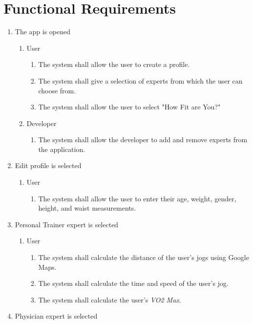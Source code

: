 \documentclass[12pt,letterpaper]{article}
\begin{document}
\section{Functional Requirements}
\label{sec:functional_requirements}
\begin{enumerate}[{BE}1. ]
	\item The app is opened
	\begin{enumerate}[{VP1}.1]
		\item User
			\begin{enumerate}
				\item The system shall allow the user to create a profile.
				\item The system shall give a selection of experts from which the user can choose from.
				\item The system shall allow the user to select "How Fit are You?"
			\end{enumerate}
		\item Developer
			\begin{enumerate}
				\item The system shall allow the developer to add and remove experts from the application.
			\end{enumerate}
	\end{enumerate}
	\item Edit profile is selected
	\begin{enumerate}[{VP2}.1]
		\item User
			\begin{enumerate}
				\item The system shall allow the user to enter their age, weight, gender, height, and waist measurements.
			\end{enumerate}
	\end{enumerate}
	\item Personal Trainer expert is selected
	\begin{enumerate}[{VP3}.1]
		\item User
			\begin{enumerate}
				\item The system shall calculate the distance of the user's jogs using Google Maps.
				\item The system shall calculate the time and speed of the user's jog.
				\item The system shall calculate the user's \textit{VO2 Max}.
			\end{enumerate}
	\end{enumerate}
	\item Physician expert is selected

\end{enumerate}
\end{document}
